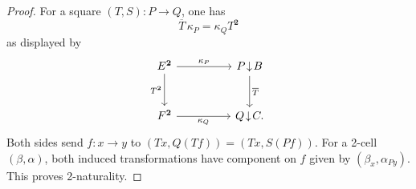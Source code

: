 \documentclass[11pt]{article}
\theoremstyle{plain}
\theoremstyle{definition}
\theoremstyle{remark}
\numberwithin{equation}{section}
\begin{document}
\begin{proof}
For a square $(T,S)\colon P\to Q$, one has
\begin{equation*}
\overline T\,\kappa_P=\kappa_Q T^{\mathbf 2}
\end{equation*}
as displayed by
\begin{equation*}
\begin{tikzcd}[column sep=huge,row sep=large]
E^{\mathbf 2} \arrow[r,"\kappa_P"] \arrow[d,"T^{\mathbf 2}"']
& P\!\downarrow\!B \arrow[d,"\overline T"] \\
F^{\mathbf 2} \arrow[r,"\kappa_Q"']
& Q\!\downarrow\!C .
\end{tikzcd}
\end{equation*}
Both sides send $f\colon x\to y$ to
$(Tx,Q(Tf))=(Tx,S(Pf))$.  For a 2-cell
$(\beta,\alpha)$, both induced transformations have component on $f$
given by $(\beta_x,\alpha_{Py})$.  This proves 2-naturality.


\end{proof}
\end{document}

